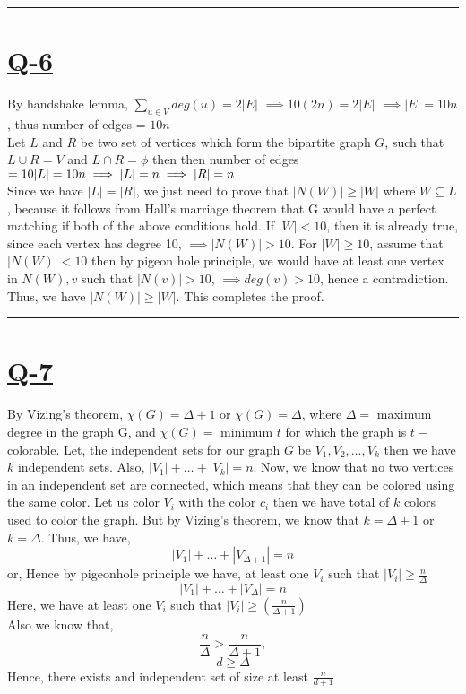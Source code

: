 \documentclass[14pt]{article}
\begin{document}
	\vspace{2cm}
	\hrule
	\vspace{0.5cm}
	
	\section*{\underline{Q-6}}
		\noindent
		\linebreak
		By handshake lemma, $\sum_{u \in V}^{} deg(u) = 2| E |$
		$\implies 10(2n) = 2| E |$ \space $\implies | E | = 10n$, thus 
		number of edges = $10n$\\
		\linebreak
		Let $L$ and $R$ be two set of vertices which form the bipartite graph $G$, such that $L \cup R = V$ and $L \cap R = \phi$ then then number of edges $= 10| L | = 10n \space \implies | L | = n \space \implies | R | = n$\\
		\linebreak
		Since we have $| L | = | R |$, we just need to prove that $| N(W) | \geq | W |$ where $W \subseteq L$, because it follows from Hall's marriage theorem that G would have a perfect matching if both of the above conditions hold. If $| W | < 10$, then it is already true, since each vertex has degree 10, $\implies | N(W)| > 10$. For $| W | \geq 10$, assume that $| N(W) | < 10$ then by pigeon hole principle, we would have at least one vertex in $N(W), v$ such that $| N(v) |>10$, $\implies deg(v) > 10$, hence a contradiction. Thus, we have $| N(W) | \geq | W |$. This completes the proof.\\
		
	\vspace{2cm}
	\hrule
	\vspace{0.5cm}
	
	\section*{\underline{Q-7}}
		\noindent
		\linebreak
		By Vizing's theorem, $\chi(G) = \Delta + 1$ or $\chi(G) = \Delta$, where $\Delta = $ maximum degree in the graph G, and $\chi(G) = $ minimum $t$ for which the graph is $t-$colorable. Let, the independent sets for our graph $G$ be $V_1, V_2, \dots ,V_k$ then we have $k$ independent sets. Also, $|V_1| + \dots + |V_k| = n$. Now, we know that no two vertices in an independent set are connected, which means that they can be colored using the same color. Let us color $V_i$ with the color $c_i$ then we have total of $k$ colors used to color the graph. But by Vizing's theorem, we know that $k=\Delta + 1$ or $k = \Delta$. Thus, we have,
		$$|V_1| + \dots + |V_{\Delta + 1}| = n$$ or,
		Hence by pigeonhole principle we have, at least one $V_i$ such that $|V_i| \geq \frac{n}{\Delta}$
		$$|V_1| + \dots + |V_{\Delta}| = n$$ 
		Here, we have at least one $V_i$ such that $|V_i| \geq \left(\frac{n}{\Delta + 1}\right)$\\
		Also we know that,
		$$\frac{n}{\Delta} > \frac{n}{\Delta + 1},$$
		$$d \geq \Delta$$
		Hence, there exists and independent set of size at least $\frac{n}{d+1}$
	
\end{document}
